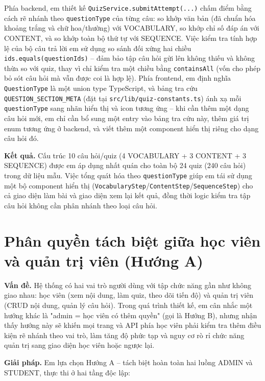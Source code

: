 \documentclass[../DoAn.tex]{subfiles}
\begin{document}
Phía backend, em thiết kế \texttt{QuizService.submitAttempt(...)} chấm điểm bằng cách rẽ nhánh theo \texttt{questionType} của từng câu: so khớp văn bản (đã chuẩn hóa khoảng trắng và chữ hoa/thường) với VOCABULARY, so khớp chỉ số đáp án với CONTENT, và so khớp toàn bộ thứ tự với SEQUENCE. Việc kiểm tra tính hợp lệ của bộ câu trả lời em sử dụng so sánh đối xứng hai chiều \texttt{ids.equals(questionIds)} -- đảm bảo tập câu hỏi gửi lên không thiếu và không thừa so với quiz, thay vì chỉ kiểm tra một chiều bằng \texttt{containsAll} (vốn cho phép bỏ sót câu hỏi mà vẫn được coi là hợp lệ). Phía frontend, em định nghĩa \texttt{QuestionType} là một union type TypeScript, và bảng tra cứu \texttt{QUESTION\_SECTION\_META} (đặt tại \texttt{src/lib/quiz-constants.ts}) ánh xạ mỗi \texttt{questionType} sang nhãn hiển thị và icon tương ứng -- khi cần thêm một dạng câu hỏi mới, em chỉ cần bổ sung một entry vào bảng tra cứu này, thêm giá trị enum tương ứng ở backend, và viết thêm một component hiển thị riêng cho dạng câu hỏi đó.

\textbf{Kết quả.} Cấu trúc 10 câu hỏi/quiz (4 VOCABULARY + 3 CONTENT + 3 SEQUENCE) được em áp dụng nhất quán cho toàn bộ 24 quiz (240 câu hỏi) trong dữ liệu mẫu. Việc tổng quát hóa theo \texttt{questionType} giúp em tái sử dụng một bộ component hiển thị (\texttt{VocabularyStep}/\texttt{ContentStep}/\texttt{SequenceStep}) cho cả giao diện làm bài và giao diện xem lại kết quả, đồng thời logic kiểm tra tập câu hỏi không cần phân nhánh theo loại câu hỏi.

\section{Phân quyền tách biệt giữa học viên và quản trị viên (Hướng A)}
\label{section:5.2}

\textbf{Vấn đề.} Hệ thống có hai vai trò người dùng với tập chức năng gần như không giao nhau: học viên (xem nội dung, làm quiz, theo dõi tiến độ) và quản trị viên (CRUD nội dung, quản lý câu hỏi). Trong quá trình thiết kế, em cân nhắc một hướng khác là "admin = học viên có thêm quyền" (gọi là Hướng B), nhưng nhận thấy hướng này sẽ khiến mọi trang và API phía học viên phải kiểm tra thêm điều kiện rẽ nhánh theo vai trò, làm tăng độ phức tạp và nguy cơ rò rỉ chức năng quản trị sang giao diện học viên hoặc ngược lại.

\textbf{Giải pháp.} Em lựa chọn Hướng A -- tách biệt hoàn toàn hai luồng ADMIN và STUDENT, thực thi ở hai tầng độc lập:
\end{document}
